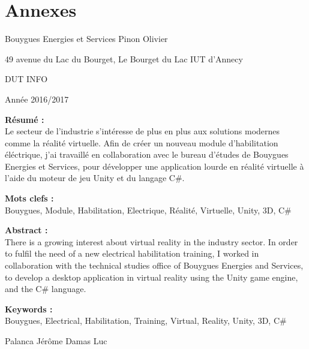 \documentclass[a4paper]{article}
\begin{document}
    \section{Annexes}
    
    \newpage 
    
    \normalsize
    
    Bouygues Energies et Services
    \hfill
    Pinon Olivier

    49 avenue du Lac du Bourget, Le Bourget du Lac
    \hfill
    IUT d'Annecy \newline 
    
    \begin{flushright}
        DUT INFO
    \end{flushright}
    
     \begin{flushright}
        Année 2016/2017
    \end{flushright}
    
    \vfill 
    \begin{flushleft}
    \huge \textbf{Résumé : } \\
    \normalsize Le secteur de l'industrie s'intéresse de plus en plus aux solutions modernes comme la réalité virtuelle. Afin de créer un nouveau module d'habilitation éléctrique, j'ai travaillé en collaboration avec le bureau d'études de Bouygues Energies et Services, pour développer une application lourde en réalité virtuelle à l'aide du moteur de jeu Unity et du langage C\#. \\
    \end{flushleft}
    
    \vfill 
    \begin{flushleft}
    \huge \textbf{Mots clefs : } \vspace{2pt} \\
    \normalsize Bouygues, Module, Habilitation, Electrique, Réalité, Virtuelle, Unity, 3D, C\#
    \end{flushleft}
    
    \vfill 
    \begin{flushleft}
    \huge \textbf{Abstract : } \\
    \normalsize There is a growing interest about virtual reality in the industry sector. In order to fulfil the need of a new electrical habilitation training, I worked in collaboration with the technical studies office of Bouygues Energies and Services, to develop a desktop application in virtual reality using the Unity game engine, and the C\# language.
    \end{flushleft}
    
    \vfill 
    \begin{flushleft}
    \huge \textbf{Keywords : } \\
    \normalsize Bouygues, Electrical, Habilitation, Training, Virtual, Reality, Unity, 3D, C\#
    \end{flushleft}

	\vfill
    Palanca Jérôme \hfill Damas Luc
\end{document}
